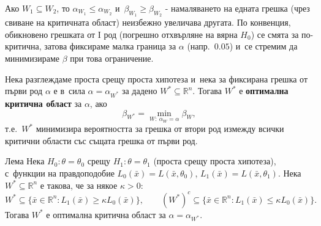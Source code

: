 \begin{rembox}
Ако $W_1\subseteq W_2$, то $\alpha_{W_1}\le\alpha_{W_2}$ и~$\beta_{W_1}\ge\beta_{W_2}$ - намаляването на едната грешка (чрез
свиване на критичната област) неизбежно увеличава другата. По
конвенция, обикновено грешката от I род (погрешно отхвърляне на
вярна $H_0$) се смята за по-критична, затова фиксираме малка граница
за $\alpha$ (напр.\ $0.05$) и~се стремим да минимизираме $\beta$ при
това ограничение.
\end{rembox}

\begin{defbox}
Нека разглеждаме проста срещу проста хипотеза и~нека за фиксирана
грешка от първи род $\alpha$ е в~сила $\alpha=\alpha_{W^*}$ за дадено
$W^*\subseteq\mathbb R^n$. Тогава $W^*$ е \textbf{оптимална критична
област} за $\alpha$, ако
\[
  \beta_{W^*} = \min_{W:\ \alpha_W=\alpha} \beta_W,
\]
т.е.\ $W^*$ минимизира вероятността за грешка от втори род измежду
всички критични области със същата грешка от първи род.
\end{defbox}

\begin{thmbox}{Лема}
Нека $H_0:\theta=\theta_0$ срещу $H_1:\theta=\theta_1$ (проста
срещу проста хипотеза), с~функции на правдоподобие $L_0(\bar x)=
L(\bar x,\theta_0)$, $L_1(\bar x)=L(\bar x,\theta_1)$. Нека
$W^*\subseteq\mathbb R^n$ е такова, че за някое $\kappa>0$:
\[
  W^* \subseteq \{\bar x\in\mathbb R^n : L_1(\bar x)\ge\kappa L_0(\bar x)\},
  \qquad
  (W^*)^c \subseteq \{\bar x\in\mathbb R^n : L_1(\bar x)\le\kappa L_0(\bar x)\}.
\]
Тогава $W^*$ е оптимална критична област за $\alpha=\alpha_{W^*}$.
\end{thmbox}

